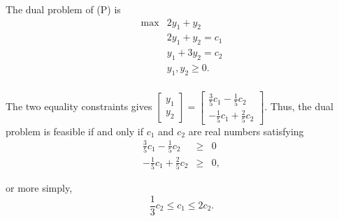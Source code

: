 \begin{enumerate}
  The dual problem of (P) is \[\begin{array}{rl}
  \max & 2 y_1 + y_2 \\
  & 2y_1 + y_2 = c_1 \\
  & y_1 + 3y_2 = c_2 \\
  & y_1 , y_2 \geq 0. \\
  \end{array}
  \]

  The two equality constraints gives
  \(\begin{bmatrix} y_1 \\ y_2 \end{bmatrix} = \begin{bmatrix} \frac{3}{5}c_1 - \frac{1}{5} c_2 \\ -\frac{1}{5}c_1 + \frac{2}{5} c_2 \end{bmatrix}.\)
  Thus, the dual problem is feasible if and only if \(c_1\) and \(c_2\)
  are real numbers satisfying
  \begin{align*}
  \frac{3}{5}c_1 - \frac{1}{5} c_2 & \geq & 0 \\
  -\frac{1}{5}c_1 + \frac{2}{5} c_2  & \geq & 0,
  \end{align*}

  or more simply, \[\frac{1}{3} c_2 \leq c_1 \leq 2 c_2.\]
\end{enumerate}
